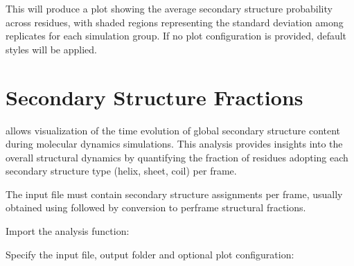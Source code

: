 \documentclass[a4paper,10pt,english]{sphinxmanual}
\begin{document}
\begin{sphinxVerbatim}[commandchars=\\\{\}]
\end{sphinxVerbatim}

\sphinxAtStartPar
This will produce a plot showing the average secondary structure probability across residues, with shaded regions representing the standard deviation among replicates for each simulation group. If no plot configuration is provided, default styles will be applied.


\section{Secondary Structure Fractions}
\label{\detokenize{Input:secondary-structure-fractions}}
\sphinxAtStartPar
{} allows visualization of the time evolution of global secondary structure content during molecular dynamics simulations. This analysis provides insights into the overall structural dynamics by quantifying the fraction of residues adopting each secondary structure type (helix, sheet, coil) per frame.

\sphinxAtStartPar
The input  file must contain secondary structure assignments per frame, usually obtained using  followed by conversion to per\sphinxhyphen{}frame structural fractions.

\sphinxAtStartPar
{}

\sphinxAtStartPar
Import the analysis function:

\begin{sphinxVerbatim}[commandchars=\\\{\}]
 
\end{sphinxVerbatim}

\sphinxAtStartPar
Specify the input file, output folder and optional plot configuration:
\end{document}
